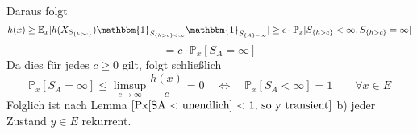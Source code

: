 \begin{itemize}
\begin{equation*}
\end{equation*}
Daraus folgt
\begin{equation*}
h(x) \geq \mathbb{E}_{x}[h(X_{S_{{\lbrace h > c \rbrace}}}) \mathbbm{1}_{S_{{\lbrace h > c \rbrace} < \infty}}\mathbbm{1}_{S_{{\lbrace A \rbrace} = \infty}}] \geq c \cdot \mathbb{P}_{x}[S_{{\lbrace h > c \rbrace}} < \infty, S_{{\lbrace h > c \rbrace}} = \infty]
\end{equation*}
\begin{equation*}
= c \cdot \mathbb{P}_{x}[S_{A} = \infty]
\end{equation*}
Da dies für jedes $c \geq 0$ gilt, folgt schließlich
\begin{equation*}
\mathbb{P}_{x}[S_{A} = \infty] \leq \limsup_{c \to \infty} \dfrac{h(x)}{c} = 0 \quad \Leftrightarrow \quad \mathbb{P}_{x}[S_{A} < \infty] = 1 \qquad \forall x \in E
\end{equation*}
Folglich ist nach Lemma $\ref{Px[SA < unendlich] < 1, so y transient}$ b) jeder Zustand $y \in E$ rekurrent.
\end{itemize}


